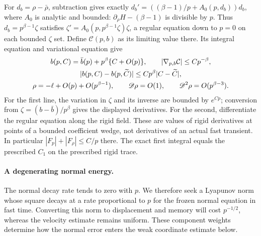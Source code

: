 For $d_b=\rho-\bar\rho$, subtraction gives exactly
$d_b'=((\beta-1)/p+A_0(p,d_b))d_b$, where $A_0$ is analytic
and bounded: $\partial_\rho H-(\beta-1)$ is divisible by $p$.
Thus $d_b=p^{\beta-1}\zeta$ satisfies
$\zeta'=A_0(p,p^{\beta-1}\zeta)\zeta$, a regular equation down
to $p=0$ on each bounded $\zeta$ set. Define $\mathcal C(p,b)$
as its limiting value there. Its integral equation and variational
equation give
\begin{gather}
 b(p,C)=\bar b(p)+p^\beta\{C+O(p)\},\qquad
 |\nabla_{p,b}\mathcal C|\le Cp^{-\beta},\notag\\
 |b(p,C)-b(p,\widetilde C)|\le Cp^\beta|C-\widetilde C|,
 \label{ent:weak-coordinate}\\
 \rho=-\ell+O(p)+O(p^{\beta-1}),\qquad
 \mathscr D\rho=O(1),\qquad
 \mathscr D^2\rho=O(p^{\beta-3}).
 \label{ent:weak-derivatives}
\end{gather}
For the first line, the variation in $\zeta$ and its inverse are
bounded by $e^{Cp}$; conversion from
$\zeta=(b-\bar b)/p^\beta$ gives the displayed derivatives.
For the second, differentiate the regular equation along the rigid
field. These are values of rigid derivatives at points of a bounded
coefficient wedge, not derivatives of an actual fast transient.
In particular $|F_p|+|F_\rho|\le C/p$ there. The exact first
integral equals the prescribed $C_1$ on the prescribed rigid trace.

\paragraph{A degenerating normal energy.}
The normal decay rate tends to zero with $p$. We therefore seek a
Lyapunov norm whose square decays at a rate proportional to $p$ for
the frozen normal equation in fast time. Converting this norm to
displacement and memory will cost
$p^{-1/2}$, whereas the velocity estimate remains uniform. These
component weights determine how the normal error enters the weak
coordinate estimate below.

